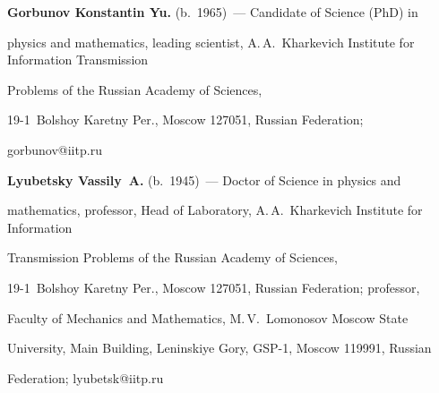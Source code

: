 \pagebreak





\Contr





\noindent


\textbf{Gorbunov Konstantin Yu.} (b.\ 1965)~--- Candidate of Science (PhD) in 


physics and mathematics, leading scientist, A.\,A.~Kharkevich Institute for Information Transmission 


Problems of the Russian Academy of Sciences, 


\mbox{19-1}~Bolshoy Karetny Per., Moscow 127051, Russian Federation; 


\mbox{gorbunov@iitp.ru}





\vspace*{3pt}





\noindent


\textbf{Lyubetsky Vassily~A.} (b.\ 1945)~--- Doctor of Science in physics and 


mathematics, professor, Head of Laboratory, A.\,A.~Kharkevich Institute for Information 


Transmission Problems of the Russian Academy of Sciences, 


\mbox{19-1}~Bolshoy Karetny Per., Moscow 127051, Russian Federation; professor, 


Faculty of Mechanics and Mathematics, M.\,V.~Lomonosov Moscow State 


University, Main Building, Leninskiye Gory, GSP-1, Moscow 119991, Russian 


Federation; \mbox{lyubetsk@iitp.ru}


\label{end\stat}








\renewcommand{\bibname}{\protect\rm Литература} 



